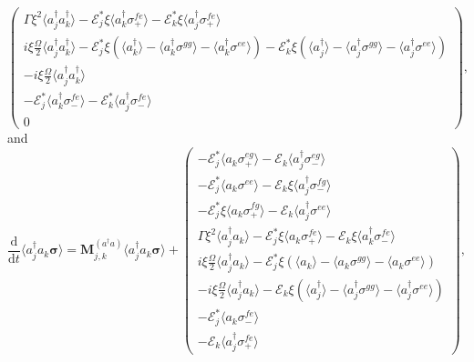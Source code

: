 \documentclass{article}
\newcommand{\ddt}[1][]{\frac{\mathrm{d} #1}{\mathrm{d}t}}
\begin{document}
\begin{subequations}
\begin{equation}
\begin{pmatrix}
		\Gamma \xi^{2} \langle a_{j}^{\dagger} a^{\dagger}_{k} \rangle - \mathcal{E}_{j}^{*} \xi \langle a^{\dagger}_{k} \sigma^{fe}_{+} \rangle - \mathcal{E}_{k}^{*} \xi \langle a^{\dagger}_{j} \sigma^{fe}_{+} \rangle \\
		i \xi \frac{\Omega}{2} \langle a_{j}^{\dagger} a^{\dagger}_{k} \rangle - \mathcal{E}_{j}^{*} \xi \left( \langle a^{\dagger}_{k} \rangle - \langle a^{\dagger}_{k} \sigma^{gg} \rangle - \langle a^{\dagger}_{k} \sigma^{ee} \rangle \right) - \mathcal{E}_{k}^{*} \xi \left( \langle a^{\dagger}_{j} \rangle - \langle a^{\dagger}_{j} \sigma^{gg} \rangle - \langle a^{\dagger}_{j} \sigma^{ee} \rangle \right) \\
		-i \xi \frac{\Omega}{2} \langle a_{j}^{\dagger} a^{\dagger}_{k} \rangle \\
		-\mathcal{E}_{j}^{*} \langle a^{\dagger}_{k} \sigma^{fe}_{-} \rangle - \mathcal{E}_{k}^{*} \langle a^{\dagger}_{j} \sigma^{fe}_{-} \rangle \\
		0
	\end{pmatrix},
\end{equation}
\end{subequations}
and
\begin{equation}
	\ddt \langle a^{\dagger}_{j} a_{k} \bm{\sigma} \rangle = \bm{M}_{j, k}^{(a^{\dagger} a)} \langle a^{\dagger}_{j} a_{k} \bm{\sigma} \rangle +
	\begin{pmatrix}
		-\mathcal{E}_{j}^{*} \langle a_{k} \sigma^{eg}_{+} \rangle - \mathcal{E}_{k} \langle a^{\dagger}_{j} \sigma^{eg}_{-} \rangle \\
		-\mathcal{E}_{j}^{*} \langle a_{k} \sigma^{ee} \rangle - \mathcal{E}_{k} \xi \langle a^{\dagger}_{j} \sigma^{fg}_{-} \rangle \\
		-\mathcal{E}_{j}^{*} \xi \langle a_{k} \sigma^{fg}_{+} \rangle - \mathcal{E}_{k} \langle a^{\dagger}_{j} \sigma^{ee} \rangle \\
		\Gamma \xi^{2} \langle a^{\dagger}_{j} a_{k} \rangle - \mathcal{E}_{j}^{*} \xi \langle a_{k} \sigma^{fe}_{+} \rangle - \mathcal{E}_{k} \xi \langle a^{\dagger}_{k} \sigma^{fe}_{-} \rangle \\
		i \xi \frac{\Omega}{2} \langle a^{\dagger}_{j} a_{k} \rangle - \mathcal{E}_{j}^{*} \xi \left( \langle a_{k} \rangle - \langle a_{k} \sigma^{gg} \rangle - \langle a_{k} \sigma^{ee} \rangle \right) \\
		-i \xi \frac{\Omega}{2} \langle a^{\dagger}_{j} a_{k} \rangle - \mathcal{E}_{k} \xi \left( \langle a^{\dagger}_{j} \rangle - \langle a^{\dagger}_{j} \sigma^{gg} \rangle - \langle a^{\dagger}_{j} \sigma^{ee} \rangle \right) \\
		-\mathcal{E}_{j}^{*} \langle a_{k} \sigma^{fe}_{-} \rangle \\
		-\mathcal{E}_{k} \langle a^{\dagger}_{j} \sigma^{fe}_{+} \rangle
	\end{pmatrix},
\end{equation}
\end{document}
